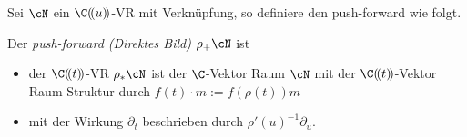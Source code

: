 Sei $\cN$ ein $\C(\!(u)\!)$-VR mit Verknüpfung, so definiere den push-forward
wie folgt.
\begin{defn}
\cite[1.a]{sabbah_Fourier-local}
Der \emph{push-forward (Direktes Bild)} $\rho_+\cN$ ist
\begin{itemize}
\item der $\C(\!(t)\!)$-VR $\rho_*\cN$ ist der $\C$-Vektor Raum $\cN$ mit
der $\C(\!(t)\!)$-Vektor Raum Struktur durch $f(t)\cdot m:=f(\rho(t))m$
\item mit der Wirkung $\partial_t$ beschrieben durch
$\rho'(u)^{-1}\partial_u$.
\end{itemize}
\end{defn}

\begin{comment}
\begin{figure}[H]
\label{fig:Push-Forward}
\caption{Zu Beispiel \ref{exmp:Push-Forward}}
\begin{center}
\fbox{
  \subfloat[Newton Polygon zu $P$]{
    \label{fig:Push-Forward1}
    \begin{tikzpicture}[scale=1.5]
    \def\myPoints{{(0,-3)}, {(1,-1)}}
    \def\myPath{(-.5,-3) -- (0,-3) -- (1,-1) -- (1,1)}
    \myNewtonPlot{\myPoints}{\myPath}{1}{-3}{1}{$N(P)$}
    \end{tikzpicture}
  }
  \quad
  \subfloat[Newton Polygon zu $\rho_+P$]{
    \label{fig:Push-Forward2}
    \begin{tikzpicture}[scale=1.5]
    \def\myPoints{{(0,-2)}, {(1,-1)}}
    \def\myPath{(-.5,-2) -- (0,-2) -- (1,-1) -- (1,1)}
    \myNewtonPlot{\myPoints}{\myPath}{1}{-3}{1}{$N(\rho_+P)$}
    \end{tikzpicture}
  }
}
\end{center}
\end{figure}
\begin{exmp}[push-forward]\label{exmp:Push-Forward}
Für $\rho:t\rightarrow u^2$, $\phi=\frac{1}{u^2}$ betrachte
\begin{align*}
\sE^\phi &\cong\hat\cD/\hat\cD\cdot(\partial_u+\partial_u\frac{1}{u^2})\\
&= \hat\cD/\hat\cD\cdot
(\underset{=:P}{\underbrace{\partial_u+\frac{2}{u^3}}})
\end{align*}
mit $ \slopes(P)=\{2\} $ (siehe Abbildung \ref{fig:Push-Forward1}).
Bilde nun das Direkte Bild über $\rho$, betrachte dazu
\begin{align*}
\partial_u+\frac{2}{u^3} &= 2u(\frac{1}{2u}\partial_u+\frac{1}{u^4}) \\
&= 2u(\rho'(u)^{-1}\partial_u+\frac{1}{u^4}) \\
&= 2u(\partial_t+\frac{1}{t^2})\\
\end{align*}
Also ist
$\rho_+\sE^\phi\cong \hat\cD/\hat\cD\cdot(\partial_t+\frac{1}{t^2})$
mit $\rho_+P=\partial_t+\frac{1}{t^2}$ und $ \slopes(\rho_+P)=\{1\} $ (siehe
Abbildung \ref{fig:Push-Forward2})
\end{exmp}
\end{comment}

